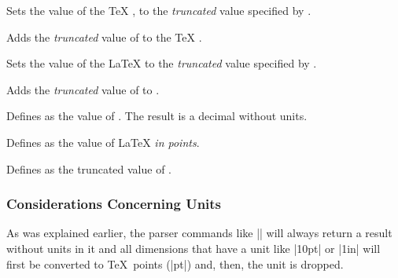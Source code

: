 \begin{command}{\pgfmathsetcount{}}
    Sets the value of the \TeX{} , to the \emph{truncated}
    value specified by .
\end{command}

\begin{command}{\pgfmathaddtocount{}}
    Adds the \emph{truncated} value  of  to the \TeX{}
    .
\end{command}

\begin{command}{\pgfmathsetcounter{}}
    Sets the value of the \LaTeX{}  to the \emph{truncated} value
    specified by .
\end{command}

\begin{command}{\pgfmathaddtocounter{}}
    Adds the \emph{truncated} value  of  to .
\end{command}

\begin{command}{\pgfmathsetmacro{}}
    Defines  as the  value of . The result is a
    decimal without units.
\end{command}

\begin{command}{\pgfmathsetlengthmacro{}}
    Defines  as the value of  \LaTeX{} \emph{in
    points}.
\end{command}

\begin{command}{\pgfmathtruncatemacro{}}
    Defines  as the truncated value of .
\end{command}


\subsubsection{Considerations Concerning Units}
\label{pgfmath-units}

As was explained earlier, the parser commands like |\pgfmathparse| will always
return a result without units in it and all dimensions that have a unit like
|10pt| or |1in| will first be converted to \TeX\ points (|pt|) and, then, the
unit is dropped.

